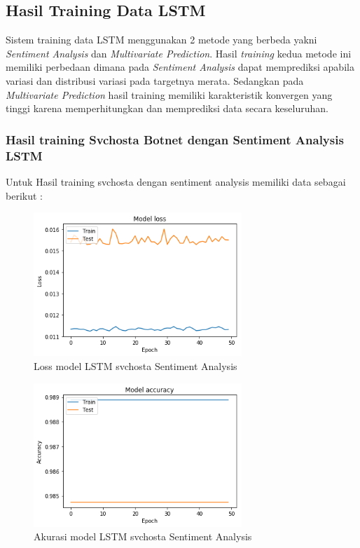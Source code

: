 \documentclass[./skripsi.tex]{subfiles}
\begin{document}
\subsection{Hasil Training Data LSTM}
\par Sistem training data LSTM menggunakan 2 metode yang berbeda yakni \textit{Sentiment Analysis} dan \textit{Multivariate Prediction}. Hasil \textit{training} kedua metode ini memiliki perbedaan dimana pada \textit{Sentiment Analysis} dapat memprediksi apabila variasi dan distribusi variasi pada targetnya merata. Sedangkan pada \textit{Multivariate Prediction} hasil training memiliki karakteristik konvergen yang tinggi karena memperhitungkan dan memprediksi data secara keseluruhan.

\subsubsection{Hasil training Svchosta Botnet dengan Sentiment Analysis LSTM}
\par Untuk Hasil training svchosta dengan sentiment analysis memiliki data sebagai berikut :
\begin{figure}%
    \centering
    \includegraphics[width=0.7\textwidth]{public/assets/img/lstms_svchosta_loss.png}
    \caption{Loss model LSTM svchosta Sentiment Analysis}
    \label{fig:lstms_svchosta_loss}
\end{figure}
\begin{figure}%
	\centering
    \includegraphics[width=0.7\textwidth]{public/assets/img/lstms_svchosta_acc.png}
    \caption{Akurasi model LSTM svchosta Sentiment Analysis}
    \label{fig:lstms_svchosta_loss}
\end{figure}
\end{document}
